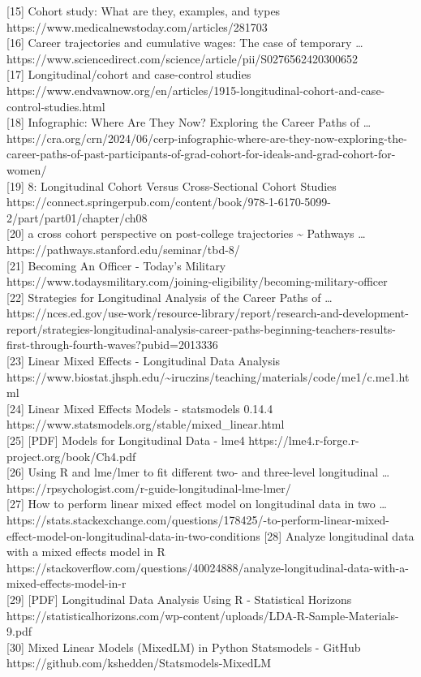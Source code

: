 \documentclass[
  letterpaper,
  DIV=11,
  numbers=noendperiod]{scrartcl}
\begin{document}
{[}15{]} Cohort study: What are they, examples, and types
https://www.medicalnewstoday.com/articles/281703\\
{[}16{]} Career trajectories and cumulative wages: The case of temporary
\ldots{}
https://www.sciencedirect.com/science/article/pii/S0276562420300652\\
{[}17{]} Longitudinal/cohort and case-control studies
https://www.endvawnow.org/en/articles/1915-longitudinal-cohort-and-case-control-studies.html\\
{[}18{]} Infographic: Where Are They Now? Exploring the Career Paths of
\ldots{}
https://cra.org/crn/2024/06/cerp-infographic-where-are-they-now-exploring-the-career-paths-of-past-participants-of-grad-cohort-for-ideals-and-grad-cohort-for-women/\\
{[}19{]} 8: Longitudinal Cohort Versus Cross-Sectional Cohort Studies
https://connect.springerpub.com/content/book/978-1-6170-5099-2/part/part01/chapter/ch08\\
{[}20{]} a cross cohort perspective on post-college trajectories
\textasciitilde{} Pathways \ldots{}
https://pathways.stanford.edu/seminar/tbd-8/\\
{[}21{]} Becoming An Officer - Today's Military
https://www.todaysmilitary.com/joining-eligibility/becoming-military-officer\\
{[}22{]} Strategies for Longitudinal Analysis of the Career Paths of
\ldots{}
https://nces.ed.gov/use-work/resource-library/report/research-and-development-report/strategies-longitudinal-analysis-career-paths-beginning-teachers-results-first-through-fourth-waves?pubid=2013336\\
{[}23{]} Linear Mixed Effects - Longitudinal Data Analysis
https://www.biostat.jhsph.edu/\textasciitilde iruczins/teaching/materials/code/me1/c.me1.html\\
{[}24{]} Linear Mixed Effects Models - statsmodels 0.14.4
https://www.statsmodels.org/stable/mixed\_linear.html\\
{[}25{]} {[}PDF{]} Models for Longitudinal Data - lme4
https://lme4.r-forge.r-project.org/book/Ch4.pdf\\
{[}26{]} Using R and lme/lmer to fit different two- and three-level
longitudinal \ldots{}
https://rpsychologist.com/r-guide-longitudinal-lme-lmer/\\
{[}27{]} How to perform linear mixed effect model on longitudinal data
in two \ldots{}
https://stats.stackexchange.com/questions/178425/\how-to-perform-linear-mixed-effect-model-on-longitudinal-data-in-two-conditions
{[}28{]} Analyze longitudinal data with a mixed effects model in R
https://stackoverflow.com/questions/40024888/analyze-longitudinal-data-with-a-mixed-effects-model-in-r\\
{[}29{]} {[}PDF{]} Longitudinal Data Analysis Using R - Statistical
Horizons
https://statisticalhorizons.com/wp-content/uploads/LDA-R-Sample-Materials-9.pdf\\
{[}30{]} Mixed Linear Models (MixedLM) in Python Statsmodels - GitHub
https://github.com/kshedden/Statsmodels-MixedLM\\
\end{document}

